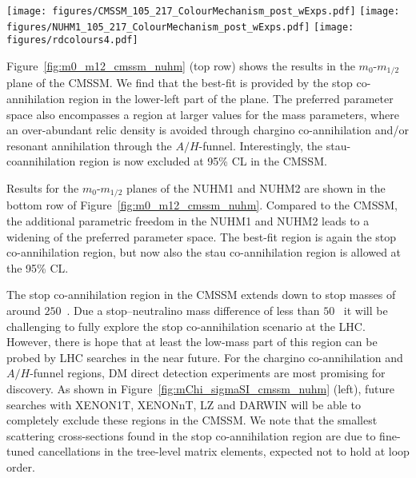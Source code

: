 \documentclass{PoS}
\newcommand{\eV}{\ensuremath{\text{e}\mspace{-0.8mu}\text{V}}\xspace}
\newcommand{\GeV}{\text{G\eV}\xspace}
\begin{document}
\begin{figure*}%
  \centering
  \texttt{[image: figures/CMSSM\_105\_217\_ColourMechanism\_post\_wExps.pdf]}
  \texttt{[image: figures/NUHM1\_105\_217\_ColourMechanism\_post\_wExps.pdf]}
  \texttt{[image: figures/rdcolours4.pdf]}
  \caption{
  \textit{Left:} The CMSSM 95\% CL region in the plane of the neutralino mass and the spin-independent neutralino-proton scattering cross-section. The final 90\% CL exclusion limit from LUX \cite{LUXrun2} along with prospective limits from future direct detection searches \cite{XENONnTLZ,DARWIN} are displayed as pink lines.
  \textit{Right:} A similar plot for the NUHM1. Figures from~\cite{CMSSM}.
  }
  \label{fig:mChi_sigmaSI_cmssm_nuhm}
\end{figure*}

Figure~\ref{fig:m0_m12_cmssm_nuhm} (top row) shows the results in the $m_0$-$m_{1/2}$ plane of the CMSSM. We find that the best-fit is provided by the stop co-annihilation region in the lower-left part of the plane.  The preferred parameter space also encompasses a region at larger values for the mass parameters, where an over-abundant relic density is avoided through chargino co-annihilation and/or resonant annihilation through the $A/H$-funnel. Interestingly, the stau-coannihilation region is now excluded at 95\% CL in the CMSSM.

Results for the $m_0$-$m_{1/2}$ planes of the NUHM1 and NUHM2 are shown in the bottom row of Figure~\ref{fig:m0_m12_cmssm_nuhm}. Compared to the CMSSM, the additional parametric freedom in the NUHM1 and NUHM2 leads to a widening of the preferred parameter space. The best-fit region is again the stop co-annihilation region, but now also the stau co-annihilation region is allowed at the 95\% CL. 

The stop co-annihilation region in the CMSSM extends down to stop masses of around $250$~\GeV. Due a stop--neutralino mass difference of less than $50$~\GeV it will be challenging to fully explore the stop co-annihilation scenario at the LHC. However, there is hope that at least the low-mass part of this region can be probed by LHC searches in the near future. For the chargino co-annihilation and $A/H$-funnel regions, DM direct detection experiments are most promising for discovery. As shown in Figure~\ref{fig:mChi_sigmaSI_cmssm_nuhm} (left), future searches with XENON1T, XENONnT, LZ and DARWIN will be able to completely exclude these regions in the CMSSM. We note that the smallest scattering cross-sections found in the stop co-annihilation region are due to fine-tuned cancellations in the tree-level matrix elements, expected not to hold at loop order. 
\end{document}

